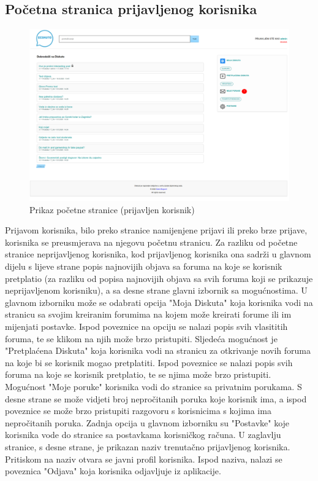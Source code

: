 \documentclass{foi}
\begin{document}
\subsection{Početna stranica prijavljenog korisnika}

\begin{figure}[h!]
    \centering
    \includegraphics[width=1\textwidth]{slike/pocetna-prijavljen.png}
    \caption{Prikaz početne stranice (prijavljen korisnik)}
\end{figure}

Prijavom korisnika, bilo preko stranice namijenjene prijavi ili preko brze prijave, korisnika se preusmjerava na njegovu početnu stranicu. Za razliku od početne stranice neprijavljenog korisnika, kod prijavljenog korisnika ona sadrži u glavnom dijelu s lijeve strane popis najnovijih objava sa foruma na koje se korisnik pretplatio (za razliku od popisa najnovijih objava sa svih foruma koji se prikazuje neprijavljenom korisniku), a sa desne strane glavni izbornik sa mogućnostima. U glavnom izborniku može se odabrati opcija "Moja Diskuta" koja korisnika vodi na stranicu sa svojim kreiranim forumima na kojem može kreirati forume ili im mijenjati postavke. Ispod poveznice na opciju se nalazi popis svih vlasititih foruma, te se klikom na njih može brzo pristupiti. Sljedeća mogućnost je "Pretplaćena Diskuta" koja korisnika vodi na stranicu za otkrivanje novih foruma na koje bi se korisnik mogao pretplatiti. Ispod poveznice se nalazi popis svih foruma na koje se korisnik pretplatio, te se njima može brzo pristupiti. Mogućnost "Moje poruke" korisnika vodi do stranice sa privatnim porukama. S desne strane se može vidjeti broj nepročitanih poruka koje korisnik ima, a ispod poveznice se može brzo pristupiti razgovoru s korisnicima s kojima ima nepročitanih poruka. Zadnja opcija u glavnom izborniku su "Postavke" koje korisnika vode do stranice sa postavkama korisničkog računa. U zaglavlju stranice, s desne strane, je prikazan naziv trenutačno prijavljenog korisnika. Pritiskom na naziv otvara se javni profil korisnika. Ispod naziva, nalazi se poveznica "Odjava" koja korisnika odjavljuje iz aplikacije.
\end{document}

